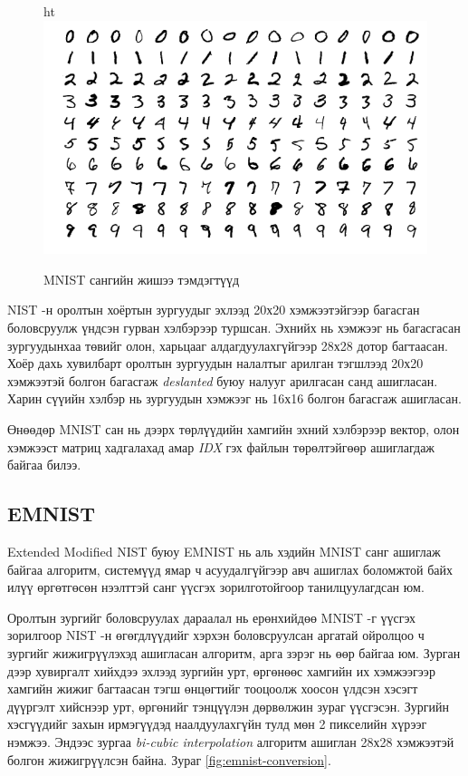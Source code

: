 \begin{figure}{ht}
	\centering
	\includegraphics[width=0.9\linewidth]{images/mnist}
	\caption{MNIST сангийн жишээ тэмдэгтүүд \cite{mnist}}
	\label{fig:mnist-sample}
\end{figure}

NIST -н оролтын хоёртын зургуудыг эхлээд 20х20 хэмжээтэйгээр багасган боловсруулж үндсэн гурван хэлбэрээр туршсан. Эхнийх нь хэмжээг нь багасгасан зургуудынхаа төвийг олон, харьцааг алдагдуулахгүйгээр 28х28 дотор багтаасан. Хоёр дахь хувилбарт оролтын зургуудын налалтыг арилган тэгшлээд 20х20 хэмжээтэй болгон багасгаж \textit{deslanted} буюу налууг арилгасан санд ашигласан. Харин сүүийн хэлбэр нь зургуудын хэмжээг нь 16х16 болгон багасгаж ашигласан.

Өнөөдөр MNIST сан нь дээрх төрлүүдийн хамгийн эхний хэлбэрээр вектор, олон хэмжээст матриц хадгалахад амар \textit{IDX} гэх файлын төрөлтэйгөөр ашиглагдаж байгаа билээ.

\subsection{EMNIST \cite{emnist}}

Extended Modified NIST буюу EMNIST нь аль хэдийн MNIST санг ашиглаж байгаа алгоритм, системүүд ямар ч асуудалгүйгээр авч ашиглах боломжтой байх илүү өргөтгөсөн нээлттэй санг үүсгэх зорилготойгоор танилцуулагдсан юм.

Оролтын зургийг боловсруулах дараалал нь ерөнхийдөө MNIST\cite{mnist} -г үүсгэх зорилгоор NIST\cite{nist19} -н өгөгдлүүдийг хэрхэн боловсруулсан аргатай ойролцоо ч зургийг жижигрүүлэхэд ашигласан алгоритм, арга зэрэг нь өөр байгаа юм. Зурган дээр хувиргалт хийхдээ эхлээд зургийн урт, өргөнөөс хамгийн их хэмжээгээр хамгийн жижиг багтаасан тэгш өнцөгтийг тооцоолж хоосон үлдсэн хэсэгт дүүргэлт хийснээр урт, өргөнийг тэнцүүлэн дөрвөлжин зураг үүсгэсэн. Зургийн хэсгүүдийг захын ирмэгүүдэд наалдуулахгүйн тулд мөн 2 пикселийн хүрээг нэмжээ. Эндээс зургаа \textit{bi-cubic interpolation} алгоритм ашиглан 28х28 хэмжээтэй болгон жижигрүүлсэн байна. Зураг \ref{fig:emnist-conversion}.


